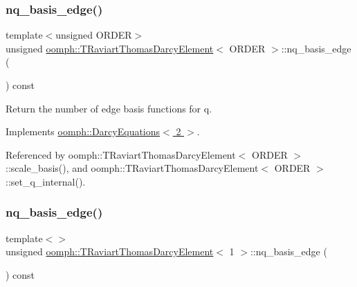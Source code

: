 \subsubsection{\texorpdfstring{nq\+\_\+basis\+\_\+edge()}{nq\_basis\_edge()}\hspace{0.1cm}{\footnotesize\ttfamily [2/3]}}
{\footnotesize\ttfamily template$<$unsigned O\+R\+D\+ER$>$ \\
unsigned \hyperlink{classoomph_1_1TRaviartThomasDarcyElement}{oomph\+::\+T\+Raviart\+Thomas\+Darcy\+Element}$<$ O\+R\+D\+ER $>$\+::nq\+\_\+basis\+\_\+edge (\begin{DoxyParamCaption}{ }\end{DoxyParamCaption}) const\hspace{0.3cm}{\ttfamily [virtual]}}



Return the number of edge basis functions for q. 



Implements \hyperlink{classoomph_1_1DarcyEquations_a13cbb6dce25734c0d3844466b0435d17}{oomph\+::\+Darcy\+Equations$<$ 2 $>$}.



Referenced by oomph\+::\+T\+Raviart\+Thomas\+Darcy\+Element$<$ O\+R\+D\+E\+R $>$\+::scale\+\_\+basis(), and oomph\+::\+T\+Raviart\+Thomas\+Darcy\+Element$<$ O\+R\+D\+E\+R $>$\+::set\+\_\+q\+\_\+internal().

\mbox{\label{classoomph_1_1TRaviartThomasDarcyElement_aeb3471d92cbe379e8c91dc6982c89e5f}} 
\subsubsection{\texorpdfstring{nq\+\_\+basis\+\_\+edge()}{nq\_basis\_edge()}\hspace{0.1cm}{\footnotesize\ttfamily [3/3]}}
{\footnotesize\ttfamily template$<$$>$ \\
unsigned \hyperlink{classoomph_1_1TRaviartThomasDarcyElement}{oomph\+::\+T\+Raviart\+Thomas\+Darcy\+Element}$<$ 1 $>$\+::nq\+\_\+basis\+\_\+edge (\begin{DoxyParamCaption}{ }\end{DoxyParamCaption}) const\hspace{0.3cm}{\ttfamily [virtual]}}



